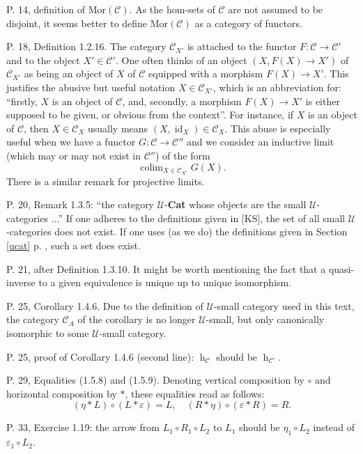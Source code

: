 \documentclass[12pt]{article}
\theoremstyle{remark}
\newcommand{\n}{\noindent}
\newcommand{\C}{\mathcal C}
\newcommand{\U}{\mathcal U}
\newcommand{\e}{\varepsilon}
\DeclareMathOperator*{\coli}{colim}
\DeclareMathOperator{\hy}{h}
\DeclareMathOperator{\id}{id}
\begin{document}
\n P. 14, definition of $\text{Mor}(\C)$. As the hom-sets of $\C$ are not assumed to be disjoint, it seems better to define $\text{Mor}(\C)$ as a category of functors. 


\n P. 18, Definition 1.2.16. The category $\C_{X'}$ is attached to the functor $F:\C\to\C'$ and to the object $X'\in\C'$. One often thinks of an object $(X,F(X)\to X')$ of $\C_{X'}$ as being an object of $X$ of $\C$ equipped with a morphism $F(X)\to X'$. This justifies the abusive but useful notation $X\in\C_{X'}$, which is an abbreviation for: ``firstly, $X$ is an object of $\C$, and, secondly, a morphism $F(X)\to X'$ is either supposed to be given, or obvious from the context''. For instance, if $X$ is an object of $\C$, then $X\in\C_X$ usually means $(X,\id_X)\in\C_X$. This abuse is especially useful when we have a functor $G:\C\to\C''$ and we consider an inductive limit (which may or may not exist in $\C''$) of the form 
%
\begin{equation}\label{convnot}
\coli_{X\in\C_{X'}}G(X).  
\end{equation}
% 
There is a similar remark for projective limits. 

\n P. 20, Remark 1.3.5: ``the category $\U$-\textbf{Cat} whose objects are the small $\U$-categories ...'' If one adheres to the definitions given in [KS], the set of all small $\U$-categories does not exist. If one uses (as we do) the definitions given in Section \ref{ucat} p. \pageref{ucat}, such a set does exist. 

\n P. 21, after Definition 1.3.10. It might be worth mentioning the fact that a quasi-inverse to a given equivalence is unique up to unique isomorphism. 

\n P. 25, Corollary 1.4.6. Due to the definition of $\U$-small category used in this text, the category $\C_A$ of the corollary is no longer $\U$-small, but only canonically isomorphic to some $\U$-small category.

\n P. 25, proof of Corollary 1.4.6 (second line): $\hy_{\C}$ should be $\hy_{\C'}$. 

\n P. 29, Equalities (1.5.8) and (1.5.9). Denoting vertical composition by $\circ$ and horizontal composition by $*$, these equalities read as follows: 
$$
(\eta*L)\circ(L*\e)=L,\quad (R*\eta)\circ(\e*R)=R.
$$

\n P. 33, Exercise 1.19: the arrow from $L_1\circ R_1\circ L_2$ to $L_1$ should be $\eta_1\circ L_2$ instead of $\varepsilon_1\circ L_2$. 
\end{document}
